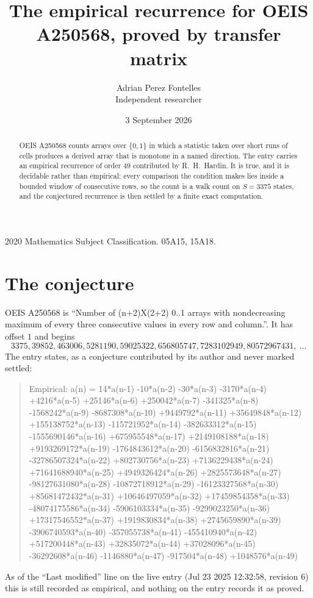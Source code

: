 \documentclass[11pt,a4paper]{article}
\title{The empirical recurrence for OEIS A250568, proved by transfer matrix}
\author{Adrian Perez Fontelles\\ \small Independent researcher}
\date{3 September 2026}
\theoremstyle{plain}
\theoremstyle{definition}
\begin{document}
\maketitle

\begin{abstract}
OEIS A250568 counts arrays over $\{0,1\}$ in which a statistic taken over short runs
of cells produces a derived array that is monotone in a named direction. The entry carries an
empirical recurrence of order $49$ contributed by R.~H.~Hardin. It is true, and it is
decidable rather than empirical: every comparison the condition makes lies inside a bounded
window of consecutive rows, so the count is a walk count on $S=3375$ states, and the
conjectured recurrence is then settled by a finite exact computation.
\end{abstract}

\noindent\small 2020 Mathematics Subject Classification. 05A15, 15A18.\normalsize

\section{The conjecture}

OEIS A250568 is ``Number of (n+2)X(2+2) 0..1 arrays with nondecreasing maximum of every three consecutive values in every row and column.''. It has offset $1$ and begins
\[
3375, 39852, 463006, 5281190, 59025322, 656805747, 7283102949, 80572967431,\ \dots
\]
The entry states, as a conjecture contributed by its author and never marked settled:
\begin{quote}
Empirical: a(n) = 14*a(n-1) -10*a(n-2) -30*a(n-3) -3170*a(n-4) +4216*a(n-5) +25146*a(n-6) +250042*a(n-7) -341325*a(n-8) -1568242*a(n-9) -8687308*a(n-10) +9449792*a(n-11) +35649848*a(n-12) +155138752*a(n-13) -115721952*a(n-14) -382633312*a(n-15) -1555690146*a(n-16) +675955548*a(n-17) +2149108188*a(n-18) +9193269172*a(n-19) -1764843612*a(n-20) -6156832816*a(n-21) -32786507324*a(n-22) +802730756*a(n-23) +7136229438*a(n-24) +71641688940*a(n-25) +4949326424*a(n-26) +2825573648*a(n-27) -98127631080*a(n-28) -10872718912*a(n-29) -16123327568*a(n-30) +85681472432*a(n-31) +10646497059*a(n-32) +17459854358*a(n-33) -48074175586*a(n-34) -5906103334*a(n-35) -9299023250*a(n-36) +17317546552*a(n-37) +1919830834*a(n-38) +2745659890*a(n-39) -3906740593*a(n-40) -357055738*a(n-41) -455410940*a(n-42) +517200448*a(n-43) +32835072*a(n-44) +37028096*a(n-45) -36292608*a(n-46) -1146880*a(n-47) -917504*a(n-48) +1048576*a(n-49)
\end{quote}
As of the ``Last modified'' line on the live entry (Jul 23 2025 12:32:58, revision 6) this is still
recorded as empirical, and nothing on the entry records it as proved.
\end{document}
